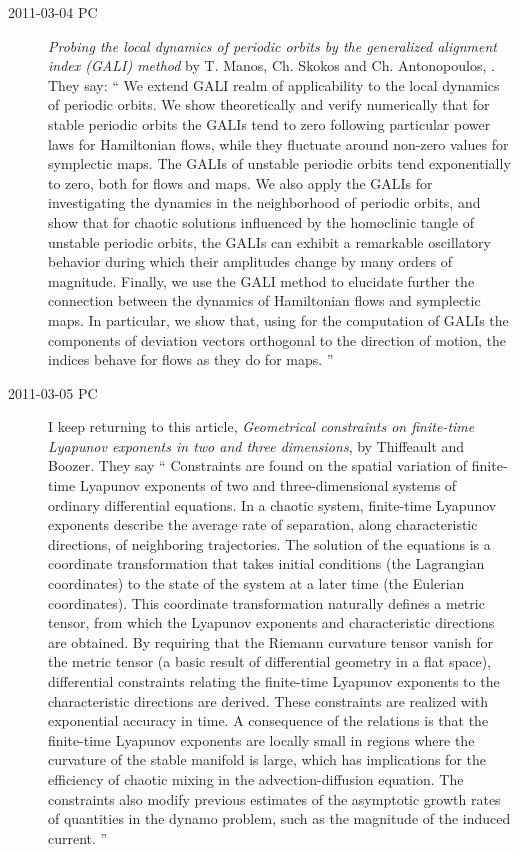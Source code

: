 \begin{description}
\item[2011-03-04 PC]
\emph{Probing the local dynamics of periodic orbits by
      the generalized alignment index (GALI) method}
by T. Manos, Ch. Skokos and  Ch. Antonopoulos,
. They say:
``
We extend GALI realm of applicability to the
local dynamics of periodic orbits. We show theoretically and verify
numerically that for stable periodic orbits the GALIs tend to zero
following particular power laws for Hamiltonian flows, while they
fluctuate around non-zero values for symplectic maps. The
GALIs of unstable periodic orbits tend exponentially to zero, both for
flows and maps. We also apply the GALIs for investigating the dynamics in
the neighborhood of periodic orbits, and show that for chaotic solutions
influenced by the homoclinic tangle of unstable periodic orbits, the
GALIs can exhibit a remarkable oscillatory behavior during which their
amplitudes change by many orders of magnitude. Finally, we use the GALI
method to elucidate further the connection between the dynamics of
Hamiltonian flows and symplectic maps. In particular, we show that, using
for the computation of GALIs the components of deviation vectors
orthogonal to the direction of motion, the indices behave for flows as
they do for maps.
''

\item[2011-03-05 PC] I keep returning to this article,
\emph{Geometrical constraints on finite-time
    		{Lyapunov} exponents in two and three dimensions},  by
Thiffeault and Boozer. They say ``
Constraints are found on the spatial variation of finite-time Lyapunov
exponents of two and three-dimensional systems of ordinary differential
equations. In a chaotic system, finite-time Lyapunov exponents describe
the average rate of separation, along characteristic directions, of
neighboring trajectories. The solution of the equations is a coordinate
transformation that takes initial conditions (the Lagrangian coordinates)
to the state of the system at a later time (the Eulerian coordinates).
This coordinate transformation naturally defines a metric tensor, from
which the Lyapunov exponents and characteristic directions are obtained.
By requiring that the Riemann curvature tensor vanish for the metric
tensor (a basic result of differential geometry in a flat space),
differential constraints relating the finite-time Lyapunov exponents to
the characteristic directions are derived. These constraints are realized
with exponential accuracy in time. A consequence of the relations is that
the finite-time Lyapunov exponents are locally small in regions where the
curvature of the stable manifold is large, which has implications for the
efficiency of chaotic mixing in the advection-diffusion equation. The
constraints also modify previous estimates of the asymptotic growth rates
of quantities in the dynamo problem, such as the magnitude of the induced
current.
''


\end{description}
